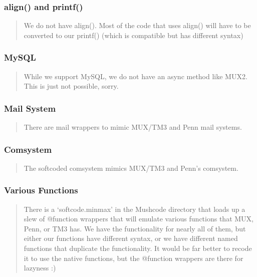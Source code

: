 \documentclass[letterpaper,10pt,english]{sphinxmanual}
\begin{document}
\subsubsection{align() and printf()}
\label{\detokenize{differences:align-and-printf}}\begin{quote}

\sphinxAtStartPar
We do not have align().  Most of the code that uses align() will have to
be converted to our printf() (which is compatible but has different syntax)
\end{quote}


\subsubsection{MySQL}
\label{\detokenize{differences:mysql}}\begin{quote}

\sphinxAtStartPar
While we support MySQL, we do not have an async method like MUX2.  This
is just not possible, sorry.
\end{quote}


\subsubsection{Mail System}
\label{\detokenize{differences:mail-system}}\begin{quote}

\sphinxAtStartPar
There are mail wrappers to mimic MUX/TM3 and Penn mail systems.
\end{quote}


\subsubsection{Comsystem}
\label{\detokenize{differences:comsystem}}\begin{quote}

\sphinxAtStartPar
The softcoded comsystem mimics MUX/TM3 and Penn’s comsystem.
\end{quote}


\subsubsection{Various Functions}
\label{\detokenize{differences:various-functions}}\begin{quote}

\sphinxAtStartPar
There is a ‘softcode.minmax’ in the Mushcode directory that loads up a slew
of @function wrappers that will emulate various functions that MUX, Penn, or
TM3 has.  We have the functionality for nearly all of them, but either our
functions have different syntax, or we have different named functions that
duplicate the functionality.  It would be far better to recode it to use
the native functions, but the @function wrappers are there for lazyness :)
\end{quote}
\end{document}
